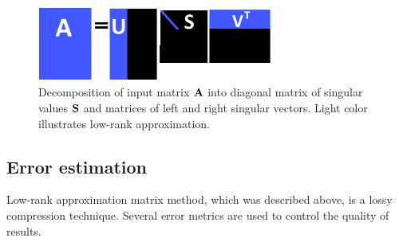 \begin{figure}[H]
\centering
\includegraphics[width=0.7\textwidth]{figures/chapter-SVD/low_rank_decomposition_diagram}
\decoRule
\caption{Decomposition of input matrix $\mathbf{A}$ into diagonal matrix of singular values $\mathbf{S}$ and matrices of left and right singular vectors. Light color illustrates low-rank approximation.}
\label{fig:lowrank_svd}
\end{figure}

\subsection{Error estimation}
\label{sec:error-estimation}

Low-rank approximation matrix method, which was described above, is a lossy compression technique. Several error metrics are used to control the quality of results.

